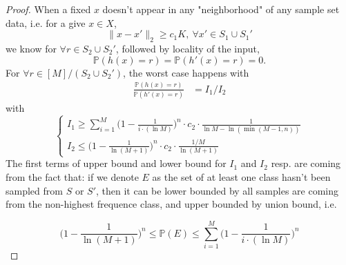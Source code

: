 \documentclass[12pt]{article}
\numberwithin{theorem}{section} %
\numberwithin{definition}{section} %
\numberwithin{assumption}{section} %
\numberwithin{lemma}{section} %
\numberwithin{remark}{section} %
\numberwithin{prop}{section} %
\numberwithin{corollary}{section} %
\numberwithin{example}{section} %
\numberwithin{question}{section} %
\numberwithin{problem}{section} %
\numberwithin{conjecture}{section} %
\numberwithin{append}{section} %
\numberwithin{property}{section} %
\def\P{{\mathbb P}}     %
\begin{document}
\begin{proof}
		
	When a fixed $x$ doesn't appear in any "neighborhood" of any sample set data, i.e. for a give $x\in X$, 
	\begin{equation}
		\lVert x-x' \rVert_2\ge c_1 K, \ \forall x'\in S_1\cup S_1'
	\end{equation}
	we know for $\forall r\in S_2\cup S_2'$, followed by locality of the input,
	\begin{equation}
		\P (h(x)=r) = \P (h'(x)=r)=0.
	\end{equation}
	For $\forall r\in [M]/(S_2\cup S_2')$, the worst case happens with
	\begin{equation}
		\begin{aligned}
			\frac{\P(h(x)=r)}{\P(h'(x)=r)} &= I_1/I_2
		\end{aligned}
	\end{equation}
 with 
 \begin{equation}
 	\begin{cases}
 		I_1\ge \sum\limits_{i=1}^M \bigg(1-\frac{1}{i\cdot (\ln M )}	 \bigg)^n \cdot c_2\cdot  \frac{1}{\ln M -\ln (\min(M-1,n))}\\
 		I_2\le \bigg(1-\frac{1}{\ln (M+1) }	 \bigg)^n \cdot c_2\cdot  \frac{1/M}{\ln (M+1)}
 	\end{cases}
 \end{equation}
The first terms of upper bound and lower bound for $I_1$ and $I_2$ resp. are coming from the fact that: if we denote $E$ as the set of at least one class hasn't been sampled from $S$ or $S'$, then it can be lower bounded by all samples are coming from the non-highest frequence class,  and upper bounded by union bound, i.e.

\begin{equation}
	\bigg(1-\frac{1}{\ln (M+1) }	 \bigg)^n\le \P(E) \le  \sum\limits_{i=1}^M \bigg(1-\frac{1}{i\cdot (\ln M )}	 \bigg)^n
\end{equation}


\end{proof}
\end{document}
